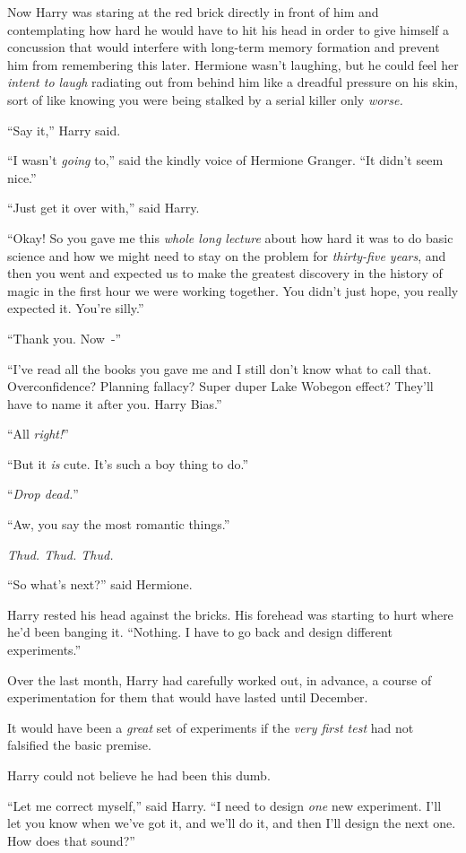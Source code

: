Now Harry was staring at the red brick directly in front of him and contemplating how hard he would have to hit his head in order to give himself a concussion that would interfere with long-term memory formation and prevent him from remembering this later. Hermione wasn't laughing, but he could feel her \emph{intent to laugh} radiating out from behind him like a dreadful pressure on his skin, sort of like knowing you were being stalked by a serial killer only \emph{worse.}

``Say it,'' Harry said.

``I wasn't \emph{going} to,'' said the kindly voice of Hermione Granger. ``It didn't seem nice.''

``Just get it over with,'' said Harry.

``Okay! So you gave me this \emph{whole long lecture} about how hard it was to do basic science and how we might need to stay on the problem for \emph{thirty-five years}, and then you went and expected us to make the greatest discovery in the history of magic in the first hour we were working together. You didn't just hope, you really expected it. You're silly.''

``Thank you. Now~-''

``I've read all the books you gave me and I still don't know what to call that. Overconfidence? Planning fallacy? Super duper Lake Wobegon effect? They'll have to name it after you. Harry Bias.''

``All \emph{right!}''

``But it \emph{is} cute. It's such a boy thing to do.''

``\emph{Drop dead.}''

``Aw, you say the most romantic things.''

\emph{Thud. Thud. Thud.}

``So what's next?'' said Hermione.

Harry rested his head against the bricks. His forehead was starting to hurt where he'd been banging it. ``Nothing. I have to go back and design different experiments.''

Over the last month, Harry had carefully worked out, in advance, a course of experimentation for them that would have lasted until December.

It would have been a \emph{great} set of experiments if the \emph{very first test} had not falsified the basic premise.

Harry could not believe he had been this dumb.

``Let me correct myself,'' said Harry. ``I need to design \emph{one} new experiment. I'll let you know when we've got it, and we'll do it, and then I'll design the next one. How does that sound?''

